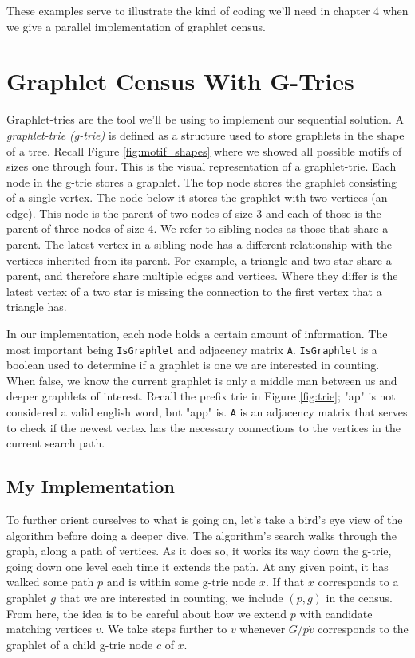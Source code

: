 \documentclass[12pt,twoside]{reedthesis}
\begin{document}
These examples serve to illustrate the kind of coding we'll need in chapter 4 when we give a parallel implementation of graphlet census.

	\chapter{Graphlet Census With G-Tries}
	
Graphlet-tries are the tool we'll be using to implement our sequential solution. A \textit{graphlet-trie (g-trie)} is defined as a structure used to store graphlets in the shape of a tree. Recall Figure \ref{fig:motif_shapes} where we showed all possible motifs of sizes one through four. This is the visual representation of a graphlet-trie. Each node in the g-trie stores a graphlet. The top node stores the graphlet consisting of a single vertex. The node below it stores the graphlet with two vertices (an edge). This node is the parent of two nodes of size 3 and each of those is the parent of three nodes of size 4. We refer to sibling nodes as those that share a parent. The latest vertex in a sibling node has a different relationship with the vertices inherited from its parent. For example, a triangle and two star share a parent, and therefore share multiple edges and vertices. Where they differ is the latest vertex of a two star is missing the connection to the first vertex that a triangle has.

In our implementation, each node holds a certain amount of information. The most important being \texttt{IsGraphlet} and adjacency matrix \texttt{A}. \texttt{IsGraphlet} is a boolean used to determine if a graphlet is one we are interested in counting. When false, we know the current graphlet is only a middle man between us and deeper graphlets of interest. Recall the prefix trie in Figure \ref{fig:trie}; "ap" is not considered a valid english word, but "app" is. \texttt{A} is an adjacency matrix that serves to check if the newest vertex has the necessary connections to the vertices in the current search path.

\section{My Implementation}

To further orient ourselves to what is going on, let's take a bird's eye view of the algorithm before doing a deeper dive. The algorithm's search walks through the graph, along a path of vertices. As it does so, it works its way down the g-trie, going down one level each time it extends the path. At any given point, it has walked some path $p$ and is within some g-trie node $x$. If  that $x$ corresponds to a graphlet $g$ that we are interested in counting, we include $(p,g)$ in the census. From here, the idea is to be careful about how we extend $p$ with candidate matching vertices $v$. We take steps further to $v$ whenever $G / p \dot v$ corresponds to the graphlet of a child g-trie node $c$ of $x$.
\end{document}

